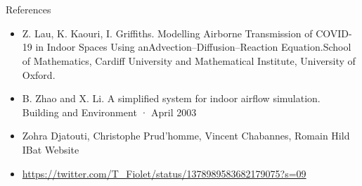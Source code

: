 \documentclass[10pt]{beamer}
\newcommand{\PIX}{}
\begin{document}
\section{\PIX} 
\begin{frame}{References }{\PIX} 
    \begin{itemize}
        \item Z. Lau, K. Kaouri, I. Griffiths. Modelling Airborne Transmission of COVID-19 in Indoor Spaces Using anAdvection–Diffusion–Reaction Equation.School of Mathematics, Cardiff University and Mathematical Institute, University of Oxford.
        \item B. Zhao and X. Li. A simplified system for indoor airflow simulation. Building and Environment · April 2003
        \item Zohra Djatouti, Christophe Prud’homme, Vincent Chabannes, Romain Hild IBat Website 
        \item \usepackage{}
        \url {https://twitter.com/T_Fiolet/status/1378989583682179075?s=09}
        
    \end{itemize}  

\end{frame}
\end{document}
